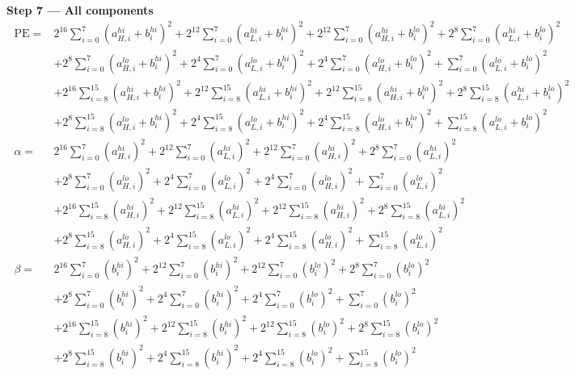 \documentclass[fleqn]{article}
\begin{document}
\textbf{Step 7 --- All components}
\[
\boxed{\;
\begin{aligned}
\mathrm{PE} ={}& 2^{16}\sum_{i=0}^{7}(a_{H,i}^{hi}{+}b_i^{hi})^2 + 2^{12}\sum_{i=0}^{7}(a_{L,i}^{hi}{+}b_i^{hi})^2 + 2^{12}\sum_{i=0}^{7}(a_{H,i}^{hi}{+}b_i^{lo})^2 + 2^{8}\sum_{i=0}^{7}(a_{L,i}^{hi}{+}b_i^{lo})^2 \\
  & + 2^{8}\sum_{i=0}^{7}(a_{H,i}^{lo}{+}b_i^{hi})^2 + 2^{4}\sum_{i=0}^{7}(a_{L,i}^{lo}{+}b_i^{hi})^2 + 2^{4}\sum_{i=0}^{7}(a_{H,i}^{lo}{+}b_i^{lo})^2 + \sum_{i=0}^{7}(a_{L,i}^{lo}{+}b_i^{lo})^2 \\
  & + 2^{16}\sum_{i=8}^{15}(a_{H,i}^{hi}{+}b_i^{hi})^2 + 2^{12}\sum_{i=8}^{15}(a_{L,i}^{hi}{+}b_i^{hi})^2 + 2^{12}\sum_{i=8}^{15}(a_{H,i}^{hi}{+}b_i^{lo})^2 + 2^{8}\sum_{i=8}^{15}(a_{L,i}^{hi}{+}b_i^{lo})^2 \\
  & + 2^{8}\sum_{i=8}^{15}(a_{H,i}^{lo}{+}b_i^{hi})^2 + 2^{4}\sum_{i=8}^{15}(a_{L,i}^{lo}{+}b_i^{hi})^2 + 2^{4}\sum_{i=8}^{15}(a_{H,i}^{lo}{+}b_i^{lo})^2 + \sum_{i=8}^{15}(a_{L,i}^{lo}{+}b_i^{lo})^2 \\[0.6em]
\alpha ={}& 2^{16}\sum_{i=0}^{7}(a_{H,i}^{hi})^2 + 2^{12}\sum_{i=0}^{7}(a_{L,i}^{hi})^2 + 2^{12}\sum_{i=0}^{7}(a_{H,i}^{hi})^2 + 2^{8}\sum_{i=0}^{7}(a_{L,i}^{hi})^2 \\
  & + 2^{8}\sum_{i=0}^{7}(a_{H,i}^{lo})^2 + 2^{4}\sum_{i=0}^{7}(a_{L,i}^{lo})^2 + 2^{4}\sum_{i=0}^{7}(a_{H,i}^{lo})^2 + \sum_{i=0}^{7}(a_{L,i}^{lo})^2 \\
  & + 2^{16}\sum_{i=8}^{15}(a_{H,i}^{hi})^2 + 2^{12}\sum_{i=8}^{15}(a_{L,i}^{hi})^2 + 2^{12}\sum_{i=8}^{15}(a_{H,i}^{hi})^2 + 2^{8}\sum_{i=8}^{15}(a_{L,i}^{hi})^2 \\
  & + 2^{8}\sum_{i=8}^{15}(a_{H,i}^{lo})^2 + 2^{4}\sum_{i=8}^{15}(a_{L,i}^{lo})^2 + 2^{4}\sum_{i=8}^{15}(a_{H,i}^{lo})^2 + \sum_{i=8}^{15}(a_{L,i}^{lo})^2 \\[0.6em]
\beta ={}& 2^{16}\sum_{i=0}^{7}(b_i^{hi})^2 + 2^{12}\sum_{i=0}^{7}(b_i^{hi})^2 + 2^{12}\sum_{i=0}^{7}(b_i^{lo})^2 + 2^{8}\sum_{i=0}^{7}(b_i^{lo})^2 \\
  & + 2^{8}\sum_{i=0}^{7}(b_i^{hi})^2 + 2^{4}\sum_{i=0}^{7}(b_i^{hi})^2 + 2^{4}\sum_{i=0}^{7}(b_i^{lo})^2 + \sum_{i=0}^{7}(b_i^{lo})^2 \\
  & + 2^{16}\sum_{i=8}^{15}(b_i^{hi})^2 + 2^{12}\sum_{i=8}^{15}(b_i^{hi})^2 + 2^{12}\sum_{i=8}^{15}(b_i^{lo})^2 + 2^{8}\sum_{i=8}^{15}(b_i^{lo})^2 \\
  & + 2^{8}\sum_{i=8}^{15}(b_i^{hi})^2 + 2^{4}\sum_{i=8}^{15}(b_i^{hi})^2 + 2^{4}\sum_{i=8}^{15}(b_i^{lo})^2 + \sum_{i=8}^{15}(b_i^{lo})^2
\end{aligned}
\;}
\]
\end{document}
